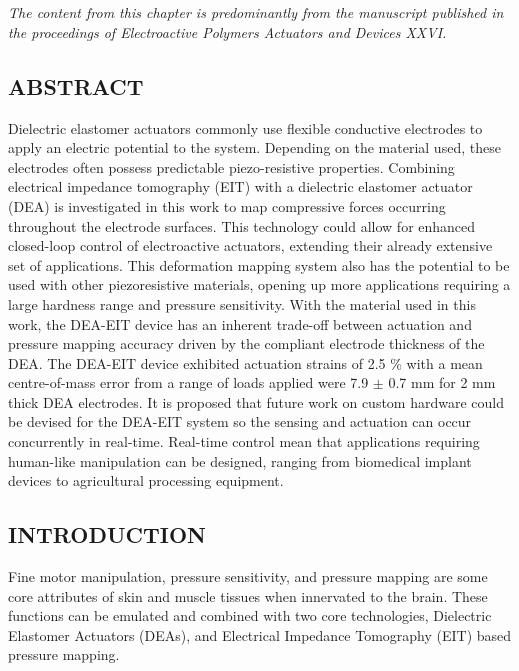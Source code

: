 \chapter{\chapviname}
\label{chapter6}
\textit{The content from this chapter is predominantly from the manuscript published in the proceedings of Electroactive Polymers Actuators and Devices XXVI.}

\begin{center}
\section*{ABSTRACT}
    Dielectric elastomer actuators commonly use flexible conductive electrodes to apply an electric potential to the system. Depending on the material used, these electrodes often possess predictable piezo-resistive properties. Combining electrical impedance tomography (EIT) with a dielectric elastomer actuator (DEA) is investigated in this work to map compressive forces occurring throughout the electrode surfaces. This technology could allow for enhanced closed-loop control of electroactive actuators, extending their already extensive set of applications. This deformation mapping system also has the potential to be used with other piezoresistive materials, opening up more applications requiring a large hardness range and pressure sensitivity. With the material used in this work, the DEA-EIT device has an inherent trade-off between actuation and pressure mapping accuracy driven by the compliant electrode thickness of the DEA. The DEA-EIT device exhibited actuation strains of 2.5 \% with a mean centre-of-mass error from a range of loads applied were 7.9 $\pm$ 0.7 mm for 2 mm thick DEA electrodes. It is proposed that future work on custom hardware could be devised for the DEA-EIT system so the sensing and actuation can occur concurrently in real-time. Real-time control mean that applications requiring human-like manipulation can be designed, ranging from biomedical implant devices to agricultural processing equipment. 	
\end{center}

	
\section{INTRODUCTION} %
	\label{sec:introduction}
     Fine motor manipulation, pressure sensitivity, and pressure mapping are some core attributes of skin and muscle tissues when innervated to the brain. These functions can be emulated and combined with two core technologies, Dielectric Elastomer Actuators (DEAs), and Electrical Impedance Tomography (EIT) based pressure mapping.
	
